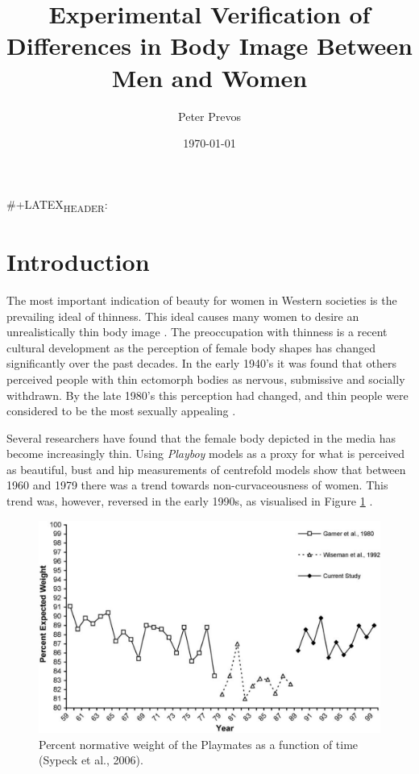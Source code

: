 \documentclass[a4paper, jou, 11pt]{apa6}
\affiliation{Monash University}
\author{Peter Prevos}
\date{\today}
\title{Experimental Verification of Differences in Body Image Between Men and Women}
\begin{document}
\#+LATEX\textsubscript{HEADER}: 

\section{Introduction}
\label{sec:org04a3de9}
The most important indication of beauty for women in Western societies is the prevailing ideal of thinness. This ideal causes many women to desire an unrealistically thin body image \cite{lamb_body_1993}. The preoccupation with thinness is a recent cultural development as the perception of female body shapes has changed significantly over the past decades. In the early 1940's it was found that others perceived people with thin ectomorph bodies as nervous, submissive and socially withdrawn. By the late 1980's this perception had changed, and thin people were considered to be the most sexually appealing \cite{turner_influence_1997}.

Several researchers have found that the female body depicted in the media has become increasingly thin. Using \emph{Playboy} models as a proxy for what is perceived as beautiful, bust and hip measurements of centrefold models show that between 1960 and 1979 there was a trend towards non-curvaceousness of women. This trend was, however, reversed in the early 1990s, as visualised in Figure \ref{playboy} \cite{garner_cultural_1980,turner_influence_1997,sypeck_cultural_2006,wiseman_cultural_1992}.

\begin{figure}[htbp]
\centering
\includegraphics[width=.9\linewidth]{playboy.png}
\caption{Percent normative weight of the Playmates as a function of time (Sypeck et al., 2006). \label{playboy}}
\end{figure}
\end{document}
